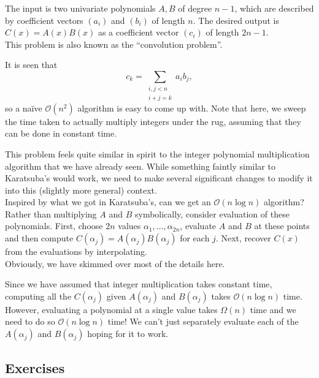 The input is two univariate polynomials $A,B$ of degree $n-1$, which are described by coefficient vectors $(a_i)$ and $(b_i)$ of length $n$. The desired output is $C(x)=A(x)B(x)$ as a coefficient vector $(c_i)$ of length $2n-1$.\\
This problem is also known as the ``convolution problem''.

It is seen that
\[ c_k = \sum_{\substack{i,j<n \\ i+j=k}} a_i b_j, \]
so a na\"ive $\mathcal{O}(n^2)$ algorithm is easy to come up with. Note that here, we sweep the time taken to actually multiply integers under the rug, assuming that they can be done in constant time.

This problem feels quite similar in spirit to the integer polynomial multiplication algorithm that we have already seen. While something faintly similar to Karatsuba's would work, we need to make several significant changes to modify it into this (slightly more general) context.\\
Inspired by what we got in Karatsuba's, can we get an $\mathcal{O}(n\log n)$ algorithm?\\

Rather than multiplying $A$ and $B$ symbolically, consider evaluation of these polynomials. First, choose $2n$ values $\alpha_1,\ldots,\alpha_{2n}$, evaluate $A$ and $B$ at these points and then compute $C(\alpha_j)=A(\alpha_j)B(\alpha_j)$ for each $j$. Next, recover $C(x)$ from the evaluations by interpolating.\\
Obviously, we have skimmed over most of the details here.

Since we have assumed that integer multiplication takes constant time, computing all the $C(\alpha_j)$ given $A(\alpha_j)$ and $B(\alpha_j)$ takes $\mathcal{O}(n\log n)$ time.\\
However, evaluating a polynomial at a single value takes $\Omega(n)$ time and we need to do so $\mathcal{O}(n\log n)$ time! We can't just separately evaluate each of the $A(\alpha_j)$ and $B(\alpha_j)$ hoping for it to work.

\subsection{Exercises}


